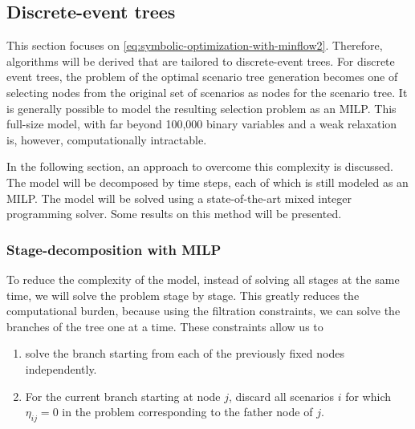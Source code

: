 \subsection{Discrete-event trees}
\label{sec:MILP-selection-problem}
This section focuses on \eqref{eq:symbolic-optimization-with-minflow2}.
Therefore, algorithms will be derived that are tailored to discrete-event trees.
For discrete event trees, the problem of the optimal scenario tree generation becomes one of selecting nodes from the original set of scenarios as nodes for the scenario tree.
It is generally possible to model the resulting selection problem as an MILP.
This full-size model, with far beyond 100,000 binary variables and a weak relaxation is, however, computationally intractable.

In the following section, an approach to overcome this complexity is discussed.
The model will be decomposed by time steps, each of which is still modeled as an MILP.
The model will be solved using a state-of-the-art mixed integer programming solver.
Some results on this method will be presented.
%
\subsubsection{Stage-decomposition with MILP}
%
To reduce the complexity of the model, instead of solving all stages at the same time, we will solve the problem stage by stage.
This greatly reduces the computational burden, because using the filtration constraints, we can solve the branches of the tree one at a time.
These constraints allow us to
\begin{enumerate}
\item solve the branch starting from each of the previously fixed nodes independently.
\item For the current branch starting at node $j$, discard all scenarios $i$ for which $\eta_{ij}=0$ in the problem corresponding to the father node of $j$.
\end{enumerate}


